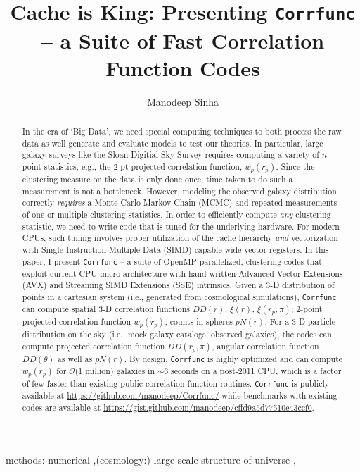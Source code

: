 \documentclass[preprint, 12pt, authoryear]{elsarticle}
\newcommand{\xir}{\ensuremath{{DD(r)}}\xspace}
\newcommand{\xiofr}{\ensuremath{{\xi(r)}}\xspace}
\newcommand{\wprp}{\ensuremath{{w_p(r_p)}}\xspace}
\newcommand{\xirppi}{\ensuremath{{\xi(r_p,\pi)}}\xspace}
\newcommand{\cis}{\ensuremath{{pN(r)}}\xspace}
\newcommand{\ddrppi}{\ensuremath{{DD(r_p,\pi)}}\xspace}
\newcommand{\wtheta}{\ensuremath{{DD(\theta)}}\xspace}
\begin{document}
\begin{frontmatter}

\title{Cache is King: Presenting {\tt Corrfunc} -- a Suite of Fast Correlation Function Codes}

\author[ms]{Manodeep Sinha}
\address[ms]{6902 Stevenson Center, Department of Physics \& Astronomy, Vanderbilt University, Nashville, TN 37235}

\begin{abstract}
In the era of `Big Data', we need special computing techniques to both process the raw data as well 
generate and evaluate models to test our theories. In particular, large galaxy surveys
like the Sloan Digitial Sky Survey requires computing a variety of $n$-point statistics, e.g., the 
2-pt projected correlation function, $\wprp$. 
Since the clustering measure on the data is only done once, time taken to do
such a measurement is not a bottleneck. However, modeling the observed galaxy distribution correctly
{\em requires} a Monte-Carlo Markov Chain (MCMC) and repeated measurements of one or multiple
clustering statistics. In order to efficiently compute {\em any} clustering statistic,
we need to write code that is tuned for the underlying hardware. For
modern CPUs, such tuning involves proper utilization of the cache hierarchy {\em and}
vectorization with Single Instruction Multiple Data (SIMD) capable wide vector registers. 
In this paper, I present {\tt Corrfunc} --  a suite of OpenMP parallelized, clustering
codes that exploit current CPU micro-architecture with hand-written Advanced
Vector Extensions (AVX) and  Streaming SIMD Extensions (SSE) intrinsics. 
Given a 3-D distribution of points in a cartesian system (i.e.,
generated from cosmological simulations), {\tt Corrfunc} can compute spatial
3-D correlation functions \xir, \xiofr, \xirppi; 2-point 
projected correlation function \wprp; counts-in-spheres \cis. For a 3-D
particle distribution on the sky (i.e., mock galaxy catalogs, observed galaxies), the codes can compute 
projected correlation function \ddrppi, angular correlation function \wtheta as
well as \cis.  By design, {\tt Corrfunc} is highly optimized 
and can compute \wprp for $\mathcal{O}$(1 million) galaxies in
$\sim 6$ seconds on a post-2011 CPU, which is a factor of few faster than 
existing public correlation function routines.  {\tt Corrfunc} is
publicly available at \url{https://github.com/manodeep/Corrfunc/} while
benchmarks with existing codes are available at
\url{https://gist.github.com/manodeep/cffd9a5d77510e43ccf0}.
\end{abstract}

\begin{keyword}
methods: numerical \sep (cosmology:) large-scale structure of universe \sep
\end{keyword}

\end{frontmatter}
\end{document}
